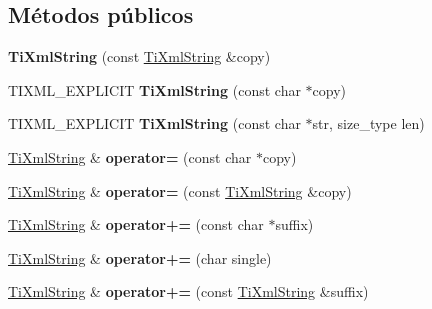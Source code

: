 \subsection*{\-Métodos públicos}
\begin{DoxyCompactItemize}
\item 
\hypertarget{classTiXmlString_ac80fe17693a438c9ab2591664743fcb6}{{\bfseries \-Ti\-Xml\-String} (const \hyperlink{classTiXmlString}{\-Ti\-Xml\-String} \&copy)}\label{classTiXmlString_ac80fe17693a438c9ab2591664743fcb6}

\item 
\hypertarget{classTiXmlString_aa3b32bd2891a757c9f36c21db44c81d2}{\-T\-I\-X\-M\-L\-\_\-\-E\-X\-P\-L\-I\-C\-I\-T {\bfseries \-Ti\-Xml\-String} (const char $\ast$copy)}\label{classTiXmlString_aa3b32bd2891a757c9f36c21db44c81d2}

\item 
\hypertarget{classTiXmlString_a4b17ea5c5db986f14827223dfa8f1547}{\-T\-I\-X\-M\-L\-\_\-\-E\-X\-P\-L\-I\-C\-I\-T {\bfseries \-Ti\-Xml\-String} (const char $\ast$str, size\-\_\-type len)}\label{classTiXmlString_a4b17ea5c5db986f14827223dfa8f1547}

\item 
\hypertarget{classTiXmlString_ae0bc6147afc0ec2aa0da3a3c0a8fcfb0}{\hyperlink{classTiXmlString}{\-Ti\-Xml\-String} \& {\bfseries operator=} (const char $\ast$copy)}\label{classTiXmlString_ae0bc6147afc0ec2aa0da3a3c0a8fcfb0}

\item 
\hypertarget{classTiXmlString_ab1f1f5d3eceaa0f22d0a7e6055ea81b0}{\hyperlink{classTiXmlString}{\-Ti\-Xml\-String} \& {\bfseries operator=} (const \hyperlink{classTiXmlString}{\-Ti\-Xml\-String} \&copy)}\label{classTiXmlString_ab1f1f5d3eceaa0f22d0a7e6055ea81b0}

\item 
\hypertarget{classTiXmlString_ab56336ac2aa2a08d24a71eb9a2b502a5}{\hyperlink{classTiXmlString}{\-Ti\-Xml\-String} \& {\bfseries operator+=} (const char $\ast$suffix)}\label{classTiXmlString_ab56336ac2aa2a08d24a71eb9a2b502a5}

\item 
\hypertarget{classTiXmlString_a6aa09d5240470b76d54ec709e04f8c13}{\hyperlink{classTiXmlString}{\-Ti\-Xml\-String} \& {\bfseries operator+=} (char single)}\label{classTiXmlString_a6aa09d5240470b76d54ec709e04f8c13}

\item 
\hypertarget{classTiXmlString_afdcae5ea2b4d9e194dc21226b817f417}{\hyperlink{classTiXmlString}{\-Ti\-Xml\-String} \& {\bfseries operator+=} (const \hyperlink{classTiXmlString}{\-Ti\-Xml\-String} \&suffix)}\label{classTiXmlString_afdcae5ea2b4d9e194dc21226b817f417}


\end{DoxyCompactItemize}
